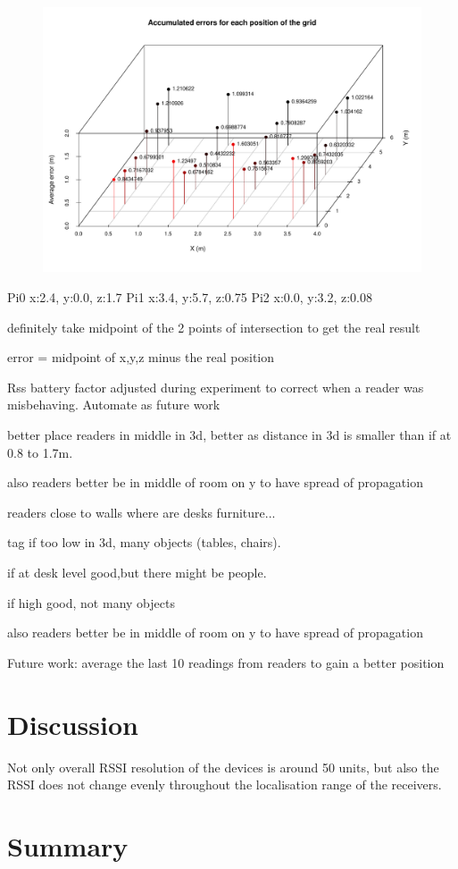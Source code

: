 \begin{figure}[H]
	\begin{center}
		\includegraphics[width=1\textwidth]{figures/tall}
		\caption{}
		\label{fig:errortall}
	\end{center}
\end{figure}

Pi0 x:2.4, y:0.0, z:1.7
Pi1 x:3.4, y:5.7, z:0.75
Pi2 x:0.0, y:3.2, z:0.08

definitely take midpoint of the 2 points of intersection to get the real result

error = midpoint of x,y,z minus the real position

Rss battery factor adjusted during experiment to correct when a reader was misbehaving. Automate as future work

better place readers in middle in 3d, better as distance in 3d is smaller than if at 0.8 to 1.7m.

also readers better be in middle of room on y to have spread of propagation \/

readers close to walls where are desks furniture... 

tag if too low in 3d, many objects (tables, chairs).

if at desk level good,but there might be people.

if high good, not many objects

also readers better be in middle of room on y to have spread of propagation \/

Future work: average the last 10 readings from readers to gain a better position

\section{Discussion}

Not only overall RSSI resolution of the devices is around 50 units, but also the RSSI does not change evenly throughout the localisation range of the receivers. 

\section{Summary}
